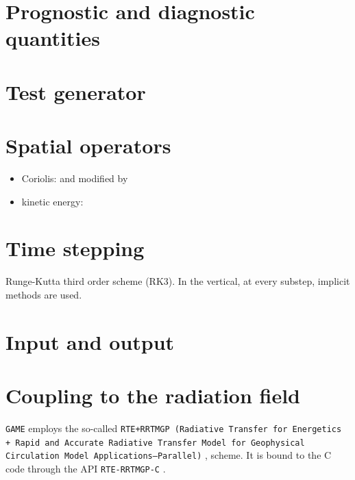 \documentclass[10pt]{report}
\begin{document}
\chapter{Prognostic and diagnostic quantities}
\label{sec:prognostic_and_diagnostic_quantities}

\chapter{Test generator}
\label{sec:test_generator}

\chapter{Spatial operators}
\label{sec:spatial_operators}

\begin{itemize}
\item Coriolis: \cite{thuburn_f_discrete_plane} and \cite{ringler_trsk} modified by \cite{doi:10.1002/qj.3294}
\item kinetic energy: \cite{doi:10.1002/qj.1960}
\end{itemize}

\chapter{Time stepping}
\label{sec:time_stepping}

Runge-Kutta third order scheme (RK3). In the vertical, at every substep, implicit methods are used.

\chapter{Input and output}
\label{sec:input_and_output}

\chapter{Coupling to the radiation field}
\label{chap:coupling_to_the_radiation_field}

\texttt{GAME} employs the so-called \texttt{RTE+RRTMGP (Radiative Transfer for Energetics + Rapid and Accurate Radiative Transfer Model for Geophysical Circulation Model Applications—Parallel)} \cite{doi:10.1029/2019MS001621}, \cite{rte-rrtmgp-github} scheme. It is bound to the C code through the API \texttt{RTE-RRTMGP-C} \cite{rte-rrtmgp-c-github}.

\appendix

\printbibliography
\end{document}
